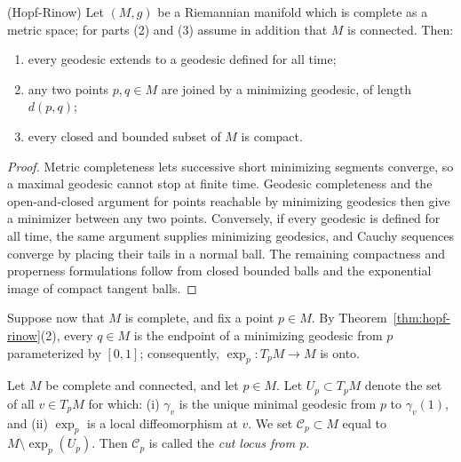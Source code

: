 \begin{theorem}
\label{thm:hopf-rinow}



(Hopf-Rinow) Let $(M,g)$ be a Riemannian manifold which is
complete as a metric space; for parts (2) and (3) assume in
addition that $M$ is connected. Then:
\begin{enumerate}
\item every geodesic extends to a geodesic defined for all time;
\item any two points $p,q\in M$ are joined by a minimizing
geodesic, of length $d(p,q)$;
\item every closed and bounded subset of $M$ is compact.
\end{enumerate}
\end{theorem}

\begin{proof}

\sketch
{}
Metric completeness lets successive short minimizing segments converge, so a maximal geodesic cannot stop at finite time. Geodesic completeness and the open-and-closed argument for points reachable by minimizing geodesics then give a minimizer between any two points. Conversely, if every geodesic is defined for all time, the same argument supplies minimizing geodesics, and Cauchy sequences converge by placing their tails in a normal ball. The remaining compactness and properness formulations follow from closed bounded balls and the exponential image of compact tangent balls.
\end{proof}

Suppose now that $M$ is complete, and fix a point $p\in M$. By
Theorem~\ref{thm:hopf-rinow}(2), every $q\in M$ is the endpoint
of a minimizing geodesic from $p$ parameterized by $[0,1]$;
consequently, $\exp_p\colon T_pM\to M$ is onto.

\begin{definition}
\label{def:cut-locus}



Let $M$ be complete and connected, and let $p\in M$. Let $U_p\subset T_pM$ denote
the set of all $v\in T_pM$ for which: (i) $\gamma_v$ is the unique
minimal geodesic from $p$ to $\gamma_v(1)$, and (ii) $\exp_p$ is
a local diffeomorphism at $v$. We set ${\mathcal C}_p\subset M$
equal to $M\setminus \exp_p(U_p)$. Then ${\mathcal C}_p$ is
called the {\sl cut locus from $p$}.
\end{definition}

